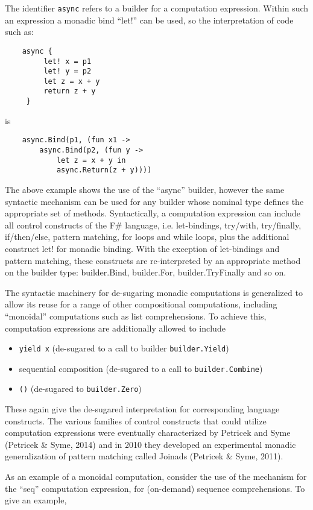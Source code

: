 \documentclass[acmsmall,review]{acmart}\settopmatter{printfolios=true,printccs=false,printacmref=false}
\begin{document}
The identifier \texttt{async} refers to a builder for a computation expression. Within such an expression a monadic bind “let!” can be used, so the interpretation of code such as:
\begin{verbatim}
    async { 
         let! x = p1 
         let! y = p2
         let z = x + y
         return z + y 
     }
\end{verbatim}
is
\begin{verbatim}
    async.Bind(p1, (fun x1 -> 
        async.Bind(p2, (fun y -> 
            let z = x + y in
            async.Return(z + y))))
\end{verbatim}
The above example shows the use of the “async” builder, however the same syntactic mechanism can be used for any builder whose nominal type defines the appropriate set of methods.  Syntactically, a computation expression can include all control constructs of the F\# language, i.e. let-bindings, try/with, try/finally, if/then/else, pattern matching, for loops and while loops, plus the additional construct let! for monadic binding. With the exception of let-bindings and pattern matching, these constructs are re-interpreted by an appropriate method on the builder type: builder.Bind, builder.For, builder.TryFinally and so on.  


The syntactic machinery for de-sugaring monadic computations is generalized to allow its reuse for a range of other compositional computations, including “monoidal” computations such as list comprehensions. To achieve this, computation expressions are additionally allowed to include 

\begin{itemize}
\item \texttt{yield x} (de-sugared to a call to builder \texttt{builder.Yield})
\item sequential composition (de-sugared to a call to \texttt{builder.Combine}) 
\item \texttt{()} (de-sugared to \texttt{builder.Zero}) 
\end{itemize}
These again give the de-sugared interpretation for corresponding language constructs.  The various families of control constructs that could utilize computation expressions were eventually characterized by Petricek and Syme (Petricek \& Syme, 2014) and in 2010 they developed an experimental monadic generalization of pattern matching called Joinads (Petricek \& Syme, 2011).

As an example of a monoidal computation, consider the use of the mechanism for the “seq” computation expression, for (on-demand) sequence comprehensions.  To give an example, 
\end{document}
